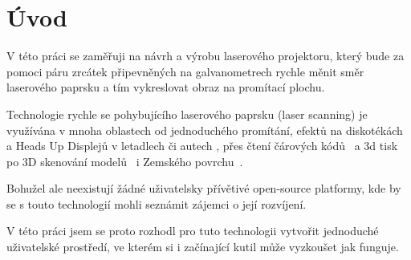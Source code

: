 \chapter*{Úvod}
V této práci se zaměřuji na návrh a výrobu laserového projektoru, který bude za pomoci páru zrcátek připevněných na galvanometrech rychle měnit směr laserového paprsku a tím vykreslovat obraz na promítací plochu.

Technologie rychle se pohybujícího laserového paprsku (laser scanning) je využívána v mnoha oblastech od jednoduchého promítání, efektů na diskotékách a Heads Up Displejů v letadlech či autech \cite{huds-in-driving}, přes čtení čárových kódů~\cite{history-of-barcode-scanning} a 3d tisk~\cite{laser-sintering} po 3D skenování modelů~\cite{3d-model-scan} i Zemského povrchu~\cite{heightmaps}.

Bohužel ale neexistují žádné uživatelsky přívětivé open-source platformy, kde by se s touto technologií mohli seznámit zájemci o její rozvíjení.

V této práci jsem se proto rozhodl pro tuto technologii vytvořit jednoduché uživatelské prostředí, ve kterém si i začínající kutil může vyzkoušet jak funguje.